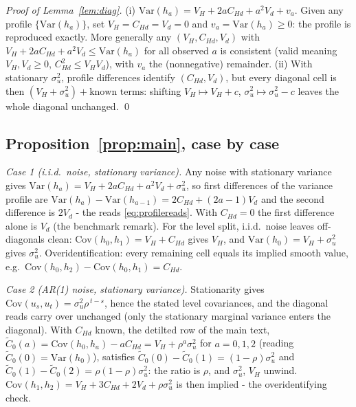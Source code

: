 \documentclass[11pt]{article}
\theoremstyle{remark}
\newcommand{\Var}{\mathrm{Var}}
\newcommand{\Cov}{\mathrm{Cov}}
\begin{document}
\emph{Proof of Lemma~\ref{lem:diag}.} (i) $\Var(h_a)=V_H+2aC_{Hd}+a^2V_d+v_a$.
Given any profile $\{\Var(h_a)\}$, set $V_H=C_{Hd}=V_d=0$ and $v_a=\Var(h_a)\ge0$: the profile is reproduced exactly.
More generally any $(V_H,C_{Hd},V_d)$ with $V_H+2aC_{Hd}+a^2V_d\le\Var(h_a)$ for all observed $a$ is consistent (valid meaning $V_H,V_d\ge0$, $C_{Hd}^2\le V_HV_d$), with $v_a$ the (nonnegative) remainder. (ii) With stationary $\sigma^2_u$, profile differences identify $(C_{Hd},V_d)$, but every diagonal cell is then $(V_H+\sigma^2_u)+\text{known terms}$: shifting $V_H\mapsto V_H+c$, $\sigma^2_u\mapsto\sigma^2_u-c$ leaves the whole diagonal unchanged.
\qed

\subsection*{Proposition~\ref{prop:main}, case by case}

\emph{Case 1 (i.i.d.\ noise, stationary variance).} Any noise with stationary variance gives $\Var(h_a)=V_H+2aC_{Hd}+a^2V_d+\sigma^2_u$, so first differences of the variance profile are $\Var(h_a)-\Var(h_{a-1})=2C_{Hd}+(2a-1)V_d$ and the second difference is $2V_d$ - the reads \eqref{eq:profilereads}.
With $C_{Hd}=0$ the first difference alone is $V_d$ (the benchmark remark).
For the level split, i.i.d.\ noise leaves off-diagonals clean: $\Cov(h_0,h_1)=V_H+C_{Hd}$ gives $V_H$, and $\Var(h_0)=V_H+\sigma^2_u$ gives $\sigma^2_u$.
Overidentification: every remaining cell equals its implied smooth value, e.g.\ $\Cov(h_0,h_2)-\Cov(h_0,h_1)=C_{Hd}$.

\emph{Case 2 (AR(1) noise, stationary variance).} Stationarity gives $\Cov(u_s,u_t)=\sigma^2_u\rho^{\,t-s}$, hence the stated level covariances, and the diagonal reads carry over unchanged (only the stationary marginal variance enters the diagonal).
With $C_{Hd}$ known, the detilted row of the main text, $\tilde C_0(a)=\Cov(h_0,h_a)-aC_{Hd}=V_H+\rho^a\sigma^2_u$ for $a=0,1,2$ (reading $\tilde C_0(0)=\Var(h_0)$), satisfies $\tilde C_0(0)-\tilde C_0(1)=(1-\rho)\sigma^2_u$ and $\tilde C_0(1)-\tilde C_0(2)=\rho(1-\rho)\sigma^2_u$: the ratio is $\rho$, and $\sigma^2_u$, $V_H$ unwind.
$\Cov(h_1,h_2)=V_H+3C_{Hd}+2V_d+\rho\sigma^2_u$ is then implied - the overidentifying check.
\end{document}
